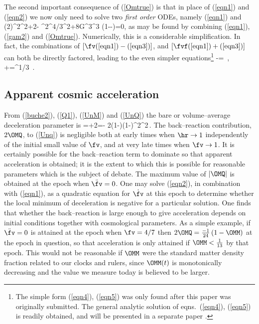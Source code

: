 \documentclass[12pt]{iopart}
\begin{document}
The second important consequence of (\ref{Omtrue}) is that in place of
(\ref{eqn1}) and (\ref{eqn2}) we now only need to solve two {\em first
order} ODEs, namely (\ref{eqn1}) and
\beq
(2){\dot\ab^2\over\ab^2}+{2}\dot\fv{\dot\ab\over\ab}-
{\al^2\fv^{4/3}\over\ab^2}+{8\pi G}{\rhb{}}{\ab{}^3\over\ab^3}
\left(1-\epi-\fv\right)=0,
\label{eqn3}\eeq
as may be found by combining (\ref{eqn1}), (\ref{gam2}) and (\ref{Omtrue}).
Numerically, this is a considerable simplification.
In fact, the combinations of $[\fv\hbox{(\ref{eqn1})}
-\hbox{(\ref{eqn3})}]$, and $[\fvf\hbox{(\ref{eqn1})}+\hbox{(\ref{eqn3})}]$
can both be directly factored, leading to the even simpler
equations\footnote{The simple form (\ref{eqn4}), (\ref{eqn5})
was only found after this paper was originally submitted. The general
analytic solution of eqns.\ (\ref{eqn4}), (\ref{eqn5}) is readily obtained,
and will be presented in a separate paper \cite{sol}.}
\bea
\fvf{\dot\ab\over\ab}-\dot\fv=
\,,
\label{eqn4}\\
{\dot\ab\over\ab}+{\dot\fv{}\fv}={\al\over\fv^{1/3}\ab}
\,.
\label{eqn5}
\eea

\subsection{Apparent cosmic acceleration\label{acc}}

{}From (\ref{buche2}), (\ref{Q1}), (\ref{UnM}) and (\ref{UnQ}) the bare
or volume--average deceleration parameter is
\beq
\bq\equiv{-\ddot\ab\over\bH^2\ab}=\half\OMM+2\OMQ=\half\OMM-
{2\fv(1-\fv)(1-\hr)^2\over\left[\hr+(1-\hr)\fv\right]^2}\,.
\label{Unq}\eeq
The back--reaction contribution, $2\OMQ$, to (\ref{Unq}) is negligible both
at early times when $\hr\to1$ independently of the initial small value of
$\fv$, and at very late times when $\fv\to1$. It is certainly possible for
the back--reaction term to dominate so that apparent acceleration is
obtained; it is the extent to which this is possible for reasonable
parameters which is the subject of debate. The maximum value of $|\OMQ|$
is obtained at the epoch when $\ddot\fv=0$. One may solve (\ref{eqn2}), in
combination with (\ref{eqn1}), as a quadratic equation for $\dot\fv$ at this
epoch to determine whether the local minimum of deceleration is negative for a
particular solution. One finds that whether the back--reaction is large
enough to give acceleration depends on initial conditions together with
cosmological parameters. As a simple example, if $\ddot\fv=0$ is attained
at the epoch when $\fv=4/7$ then $2\OMQ=\frac{-1}{24}\left(1-\OMM
\right)$ at the epoch in question, so that acceleration is only attained if
$\OMM<\frac1{13}$ by that epoch. This would not be reasonable if $\OMM$ were
the standard matter density fraction related to our clocks and rulers,
since $\OMM(t)$ is monotonically decreasing and the value we measure today is
believed to be larger.
\end{document}
